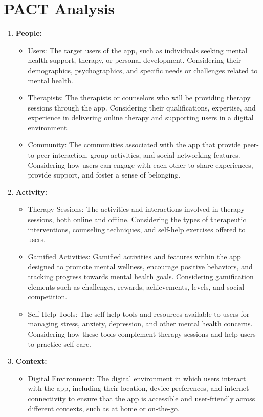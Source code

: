 \documentclass[manuscript,screen,review]{acmart}
\begin{document}
\section{PACT Analysis}
\begin{enumerate}
    \item \textbf{People:}
    \begin{itemize}
        \item Users: The target users of the app, such as individuals seeking mental health support, therapy, or personal development. Considering their demographics, psychographics, and specific needs or challenges related to mental health.
        \item Therapists: The therapists or counselors who will be providing therapy sessions through the app. Considering their qualifications, expertise, and experience in delivering online therapy and supporting users in a digital environment.
        \item Community: The communities associated with the app that provide peer-to-peer interaction, group activities, and social networking features. Considering how users can engage with each other to share experiences, provide support, and foster a sense of belonging.
    \end{itemize}
    \item \textbf{Activity:}
    \begin{itemize}
        \item Therapy Sessions: The activities and interactions involved in therapy sessions, both online and offline. Considering the types of therapeutic interventions, counseling techniques, and self-help exercises offered to users.

        \item Gamified Activities: Gamified activities and features within the app designed to promote mental wellness, encourage positive behaviors, and tracking progress towards mental health goals. Considering gamification elements such as challenges, rewards, achievements, levels, and social competition.
        \item Self-Help Tools: The self-help tools and resources available to users for managing stress, anxiety, depression, and other mental health concerns. Considering how these tools complement therapy sessions and help users to practice self-care.
    \end{itemize}
    \item \textbf{Context:}
    \begin{itemize}
        \item Digital Environment: The digital environment in which users interact with the app, including their location, device preferences, and internet connectivity to ensure that the app is accessible and user-friendly across different contexts, such as at home or on-the-go.


\end{itemize}
\end{enumerate}
\end{document}
